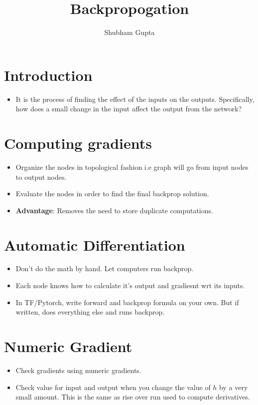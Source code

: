 \documentclass[a4paper]{article}
\title{Backpropogation}
\author{Shubham Gupta}
\begin{document}
\maketitle
\section{Introduction}
\begin{itemize}
    \item It is the process of finding the effect of the inputs on the outputs. Specifically, how does a small change in the input affect the output from the network?
\end{itemize}
\section{Computing gradients}
\begin{itemize}
    \item Organize the nodes in topological fashion i.e graph will go from input nodes to output nodes.
    \item Evaluate the nodes in order to find the final backprop solution.
    \item \textbf{Advantage}: Removes the need to store duplicate computations. 
\end{itemize}
\section{Automatic Differentiation}
\begin{itemize}
    \item Don't do the math by hand. Let computers run backprop.
    \item Each node knows how to calculate it's output and gradiesnt wrt its inputs.
    \item In TF/Pytorch, write forward and backprop formula on your own. But if written, does everything else and runs backprop.
\end{itemize}
\section{Numeric Gradient}
\begin{itemize}
    \item Check gradients using numeric gradients.
    \item Check value for input and output when you change the value of $h$ by a very small amount. This is the same as rise over run used to compute derivatives.
\end{itemize}
\end{document}
